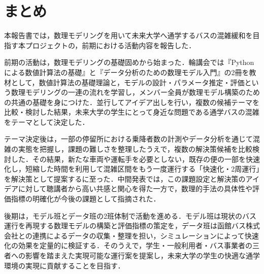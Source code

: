 \chapter{まとめ}
本報告書では，数理モデリングを用いて未来大学へ通学するバスの混雑緩和を目指す本プロジェクトの，前期における活動内容を報告した．

前期の活動は，数理モデリングの基礎固めから始まった．輪講会では『Pythonによる数値計算法の基礎』と『データ分析のための数理モデル入門』の2冊を教材として，数値計算法の基礎理論と，モデルの設計・パラメータ推定・評価という数理モデリングの一連の流れを学習し，メンバー全員が数理モデル構築のための共通の基礎を身につけた．並行してアイデア出しを行い，複数の候補テーマを比較・検討した結果，未来大学の学生にとって身近な問題である通学バスの混雑をテーマとして決定した．

テーマ決定後は，一部の停留所における乗降者数の計測やデータ分析を通じて混雑の実態を把握し，課題の難しさを整理したうえで，複数の解決策候補を比較検討した．その結果，新たな車両や運転手を必要としない，既存の便の一部を快速化し，短縮した時間を利用して混雑区間をもう一度運行する「快速化・2周運行」を解決策として提案するに至った．中間発表では，この課題設定と解決策のアイデアに対して聴講者から高い共感と関心を得た一方で，数理的手法の具体性や評価指標の明確化が今後の課題として指摘された．

後期は，モデル班とデータ班の2班体制で活動を進める．モデル班は現状のバス運行を再現する数理モデルの構築と評価指標の策定を，データ班は函館バス株式会社との連携によるデータの収集・整理を担い，シミュレーションによって快速化の効果を定量的に検証する．そのうえで，学生・一般利用者・バス事業者の三者への影響を踏まえた実現可能な運行案を提案し，未来大学の学生の快適な通学環境の実現に貢献することを目指す．
